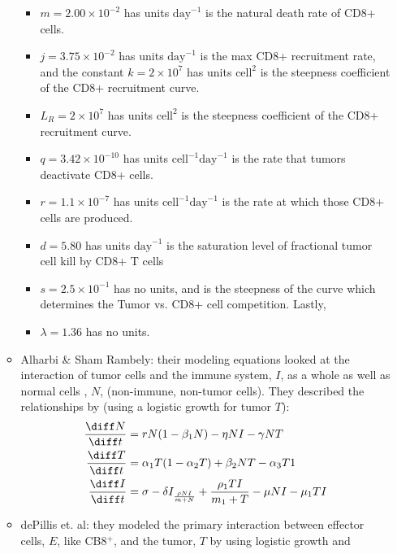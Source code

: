 \documentclass[11pt]{amsart}
\begin{document}
\begin{itemize}
\begin{itemize}
\begin{itemize}
                   		 	\item $m = 2.00 \times 10^{-2}$ has units $\text{day}^{-1}$ is the natural death rate of CD8+ cells.
                   		 	\item $j = 3.75 \times 10^{-2}$ has units $\text{day}^{-1}$ is the max CD8+ recruitment rate, and the constant $k = 2 \times 10^7$ has units $\text{cell}^2$ is the steepness coefficient of the CD8+ recruitment curve.
                   		 	\item $L_R = 2 \times 10^7$ has units $\text{cell}^2$ is the steepness coefficient of the CD8+ recruitment curve.
                   		 	\item $q = 3.42 \times 10^{-10}$ has units $\text{cell}^{-1}\text{day}^{-1}$ is the rate that tumors deactivate CD8+ cells.
                   		 	\item $r =1.1 \times 10^{-7} $ has units $\text{cell}^{-1}\text{day}^{-1}$ is the rate at which those CD8+ cells are produced. 
                    			\item $d = 5.80$ has units $\text{day}^{-1}$ is the saturation level of fractional tumor cell kill by CD8+ T cells
                    			\item $s = 2.5 \times 10^{-1}$ has no units, and is the steepness of the curve which determines the Tumor vs. CD8+ cell competition. Lastly, \item $\lambda = 1.36$ has no units. 
				\end{itemize}
			\item Alharbi \& Sham Rambely: their modeling equations looked at the interaction of tumor cells and the immune system, $I$, as a whole as well as normal cells , $N$, (non-immune, non-tumor cells). They described the relationships by (using a logistic growth for tumor $T$):
				\begin{eqnarray}
					\begin{aligned}
						\frac{\diff N}{\diff t} &= rN(1-\beta_1 N) - \eta NI - \gamma NT \\
						\frac{\diff T}{\diff t} &= \alpha_1T(1-\alpha_2T) + \beta_2 NT - \alpha_3 T1 \\
						\frac{\diff I}{\diff t} &= \sigma - \delta I _ \frac{\rho N I}{m+N} + \frac{\rho_1 TI}{m_1 + T} - \mu NI - \mu_1 TI \label{eq: AlharbiTumorImmuno}
					\end{aligned}
				\end{eqnarray}
			\item dePillis et. al: they modeled the primary interaction between effector cells, $E$, like CB8$^+$, and the tumor, $T$ by using logistic growth and 

\end{itemize}
\end{itemize}
\end{document}
